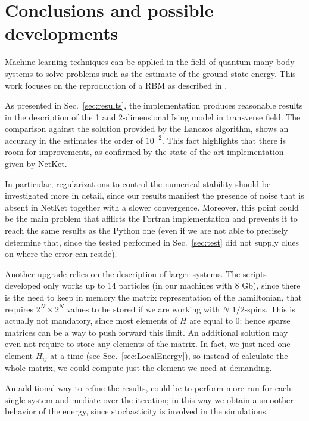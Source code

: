 \documentclass[a4paper,11pt]{article}
\begin{document}

\section{Conclusions and possible developments}
\label{sec:conclusion}

Machine learning techniques can be applied in the field of quantum many-body systems to solve problems such as the estimate of the ground state energy. This work focuses on the reproduction of a RBM as described in \cite{Carleo_2017}. 

As presented in Sec.~\ref{sec:results}, the implementation produces reasonable results in the description of the 1 and 2-dimensional Ising model in transverse field. The comparison against the solution provided by the Lanczos algorithm, shows an accuracy in the estimates the order of $10^{-2}$. This fact highlights that there is room for improvements, as confirmed by the state of the art implementation given by NetKet. 

In particular, regularizations to control the numerical stability should be investigated more in detail, since our results manifest the presence of noise that is absent in NetKet together with a slower convergence. Moreover, this point could be the main problem that afflicts the Fortran implementation and prevents it to reach the same results as the Python one (even if we are not able to precisely determine that, since the tested performed in Sec.~\ref{sec:test} did not supply clues on where the error can reside).

Another upgrade relies on the description of larger systems. The scripts developed only works up to 14 particles (in our machines with 8 Gb), since there is the need to keep in memory the matrix representation of the hamiltonian, that requires $2^N \times 2^N$ values to be stored if we are working with $N$ $1/2$-spins. This is actually not mandatory, since most elements of $H$ are equal to 0: hence sparse matrices can be a way to push forward this limit. An additional solution may even not require to store any elements of the matrix. In fact, we just need one element $H_{ij}$ at a time (see Sec.~\ref{sec:LocalEnergy}), so instead of calculate the whole matrix, we could compute just the element we need at demanding. 

An additional way to refine the results, could be to perform more run for each single system and mediate over the iteration; in this way we obtain a smoother behavior of the energy, since stochasticity is involved in the simulations.
\end{document}
